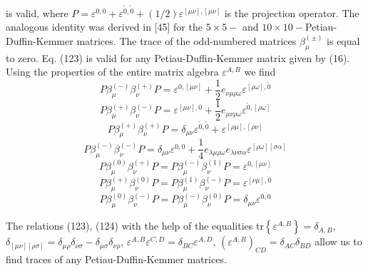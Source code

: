 \documentclass[a4paper,12pt]{article}
\begin{document}
is valid, where $P=\varepsilon ^{0,0}+\varepsilon
^{\widetilde{0},\widetilde{ 0}}+(1/2)\varepsilon ^{[\mu \nu ],[\mu
\nu ]}$ is the projection operator. The analogous identity was
derived in [45] for the $5\times 5-$ and $ 10\times
10-$Petiau-Duffin-Kemmer matrices. The trace of the odd-numbered
matrices $\beta _\mu ^{(\pm )}$ is equal to zero. Eq. (123) is
valid for any Petiau-Duffin-Kemmer matrix given by (16). Using the
properties of the entire matrix algebra $\varepsilon ^{A,B}$ we
find
\[
P\beta _\mu ^{(-)}\beta _\nu ^{(+)}P=\varepsilon ^{0,[\mu \nu ]}+\frac
12e_{\nu \mu \rho \omega }\varepsilon ^{[\rho \omega ],\widetilde{0}}
\]
\[
P\beta _\mu ^{(+)}\beta _\nu ^{(-)}P=\varepsilon ^{[\mu \nu ],0}+\frac
12e_{\mu \nu \rho \omega }\varepsilon ^{\widetilde{0},[\rho \omega ]}
\]
\[
P\beta _\mu ^{(+)}\beta _\nu ^{(+)}P=\delta _{\mu \nu }\varepsilon
^{ \widetilde{0},\widetilde{0}}+\varepsilon ^{[\rho \mu ],[\rho
\nu ]}
\]
\[
P\beta _\mu ^{(-)}\beta _\nu ^{(-)}P=\delta _{\mu \nu }\varepsilon
^{0,0}+\frac 14e_{\lambda \mu \rho \omega }e_{\lambda \nu \sigma \alpha
}\varepsilon ^{[\rho \omega ][\sigma \alpha ]}
\]
\[
P\beta _\mu ^{(0)}\beta _\nu ^{(+)}P=P\beta _\mu ^{(-)}\beta _\nu
^{(1)}P=\varepsilon ^{0,[\mu \nu ]}
\]
\[
P\beta _\mu ^{(+)}\beta _\nu ^{(0)}P=P\beta _\mu ^{(1)}\beta _\nu
^{(-)}P=\varepsilon ^{[\nu \mu ],0}
\]
\begin{equation}
P\beta _\mu ^{(0)}\beta _\nu ^{(-)}P=P\beta _\mu ^{(-)}\beta _\nu
^{(0)}P=\delta _{\mu \nu }\varepsilon ^{0,0}  \label{124}
\end{equation}

The relations (123), (124) with the help of the equalities tr$\left\{
\varepsilon ^{A,B}\right\} =\delta _{A,B}$, $\delta _{[\mu \nu ][\rho \sigma
]}=\delta _{\mu \rho }\delta _{\nu \sigma }-\delta _{\mu \sigma }\delta
_{\nu \rho }$, $\varepsilon ^{A,B}\varepsilon ^{C,D}=\delta _{BC}\varepsilon
^{A,D}$, $\left( \varepsilon ^{A,B}\right) _{CD}=\delta _{AC}\delta _{BD}$
allow us to find traces of any Petiau-Duffin-Kemmer matrices.
\end{document}
